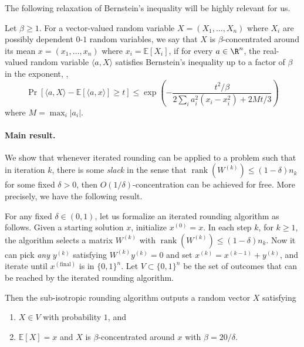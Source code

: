 \documentclass{toc}
\newcommand{\rank}{\operatorname{rank}}
\newcommand{\ip}[1]{\langle #1 \rangle}
\newcommand{\E}{\mathbb{E}}
\begin{document}
The following relaxation of Bernstein's inequality will be
%
highly  %
relevant for us.
\begin{definition} Let $\beta \geq 1$. For a
%
vector-valued   %
random variable $X=(X_1,\ldots,X_n)$ where $X_i$ are possibly dependent $0$-$1$ random variables, we say that $X$ is $\beta$-concentrated around its mean $x = (x_1,\ldots,x_n)$ where $x_i = \E[X_i]$,
if for every $a \in \R^n$, the real-valued random variable $\ip{a,X}$ satisfies Bernstein's inequality  up to a factor of $\beta$ in the exponent, \ie,
\begin{equation}
 \Pr[ \ip{a,X}- \E[\ip{a,x}] \geq t] \leq \exp\left(-\frac{t^2/\beta}{2\sum_i a_i^2(x_i-x_i^2) + 2Mt/3}\right)
 \end{equation}
%
where $M = \max_{i} |a_i|$.
\end{definition}

\paragraph{Main result.} We show that whenever iterated rounding can be applied to a problem such that in
%
iteration $k$,   %
there is some \emph{slack} in the sense that
$\rank(W^{(k)}) \leq (1-\delta) n_k$ for some fixed $\delta>0$,
then $O(1/\delta)$-concentration can be achieved for free.
More precisely, we have the following result.
%

\begin{theorem}
\label{thm:main}
For any fixed $\delta \in (0,1)$, let us formalize an iterated rounding algorithm as follows. Given a starting solution $x$, initialize $x^{(0)}=x$. In each step $k$, for $k\geq 1$, the algorithm selects a matrix $W^{(k)}$ with
$\rank(W^{(k)}) \leq  (1-\delta)n_k$. Now it can pick \emph{any} $y^{(k)}$ satisfying $W^{(k)}y^{(k)}=0$ and set $x^{(k)} = x^{(k-1)} + y^{(k)}$, and iterate until $x^{(\text{final})}$ is in $\{0,1\}^n$.
Let $V \subset \{0,1\}^n$ be the set of outcomes that can be reached by the iterated rounding algorithm. 

Then the sub-isotropic rounding algorithm outputs a random vector $X$ satisfying 
\begin{enumerate} \item $X \in V$ with probability $1$, and 
\item  $\E[X]=x$ and $X$ is $\beta$-concentrated around $x$ with $\beta=20/\delta$.
\end{enumerate}

%
%
%
%
%
%
\end{theorem}
\end{document}
